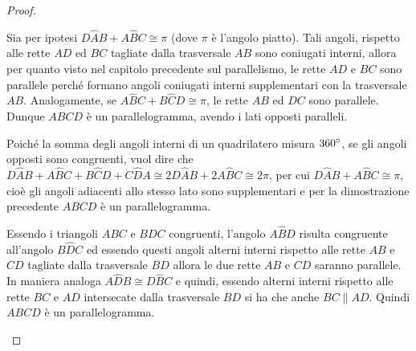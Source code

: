 \begin{proof}~\\
\begin{enumerate*}
\item Sia per ipotesi $D\widehat{A}B+A\widehat{B}C\cong \pi$ (dove $\pi$ è l'angolo piatto). Tali angoli, rispetto alle rette $AD$ ed $BC$ tagliate dalla trasversale $AB$ sono coniugati interni, allora per quanto visto nel capitolo precedente sul parallelismo, le rette $AD$ e $BC$ sono parallele perché formano angoli coniugati interni supplementari con la trasversale $AB$. Analogamente, se $A\widehat{B}C+B\widehat{C}D\cong \pi$, le rette $AB$ ed $DC$ sono parallele. Dunque $ABCD$ è un parallelogramma, avendo i lati opposti paralleli.
\item Poiché la somma degli angoli interni di un quadrilatero misura $360{}^{\circ}$, se gli angoli opposti sono congruenti, vuol dire che $D\widehat{A}B+A\widehat{B}C+B\widehat{C}D+C\widehat{D}A\cong 2D\widehat{A}B+2A\widehat{B}C\cong 2\pi$, per cui $D\widehat{A}B+A\widehat{B}C\cong\pi$, cioè gli angoli adiacenti allo stesso lato sono supplementari e per la dimostrazione precedente $ABCD$ è un parallelogramma.
\item Essendo i triangoli $ABC$ e $BDC$ congruenti, l'angolo $A\widehat{B}D$ risulta congruente all'angolo $B\widehat{D}C$ ed essendo questi angoli alterni interni rispetto alle rette $AB$ e $CD$ tagliate dalla trasversale $BD$ allora le due rette $AB$ e $CD$ saranno parallele. In maniera analoga $A\widehat{D}B\cong D\widehat{B}C$ e quindi, essendo alterni interni rispetto alle rette $BC$ e $AD$ intersecate dalla trasversale $BD$ si ha che anche $BC\parallel AD$. Quindi $ABCD$ è un parallelogramma.

\end{enumerate*}
\end{proof}
